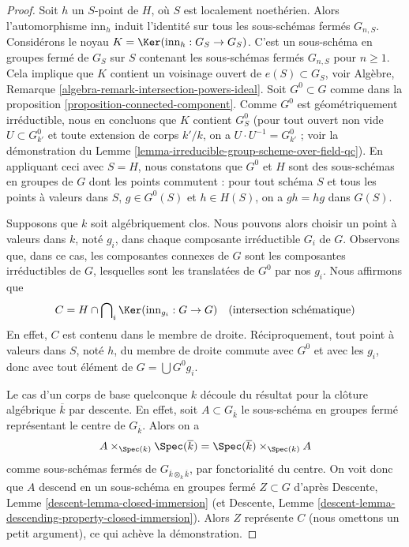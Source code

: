 \begin{proof}
\medskip\noindent
Soit $h$ un $S$-point de $H$, où $S$ est localement noethérien.
Alors l'automorphisme $\text{inn}_h$ induit l'identité sur tous
les sous-schémas fermés $G_{n, S}$. Considérons le noyau
$K = \Ker(\text{inn}_h : G_S \to G_S)$.
C'est un sous-schéma en groupes fermé de $G_S$ sur $S$ contenant les
sous-schémas fermés $G_{n, S}$ pour $n \geq 1$.
Cela implique que $K$ contient un voisinage ouvert de
$e(S) \subset G_S$, voir
Algèbre, Remarque \ref{algebra-remark-intersection-powers-ideal}.
Soit $G^0 \subset G$ comme dans la proposition \ref{proposition-connected-component}.
Comme $G^0$ est géométriquement irréductible, nous en concluons que $K$ contient
$G^0_S$ (pour tout ouvert non vide $U \subset G^0_{k'}$ et toute extension de corps
$k'/k$, on a $U \cdot U^{-1} = G^0_{k'}$ ; voir la démonstration du
Lemme \ref{lemma-irreducible-group-scheme-over-field-qc}).
En appliquant ceci avec $S = H$, nous constatons que $G^0$ et $H$
sont des sous-schémas en groupes de $G$ dont les points commutent : pour tout schéma $S$
et tous les points à valeurs dans $S$, $g \in G^0(S)$ et $h \in H(S)$, on a
$gh = hg$ dans $G(S)$.

\medskip\noindent
Supposons que $k$ soit algébriquement clos. Nous pouvons alors choisir un point à valeurs dans $k$,
noté $g_i$, dans chaque composante irréductible $G_i$ de $G$. Observons que,
dans ce cas, les composantes connexes de $G$ sont les composantes irréductibles
de $G$, lesquelles sont les translatées de $G^0$ par nos $g_i$. Nous affirmons que
$$
C = H \cap \bigcap\nolimits_i \Ker(\text{inn}_{g_i} : G \to G)
\quad (\text{intersection schématique})
$$
En effet, $C$ est contenu dans le membre de droite. Réciproquement, tout
point à valeurs dans $S$, noté $h$, du membre de droite commute avec $G^0$
et avec les $g_i$, donc avec tout élément de $G = \bigcup G^0g_i$.

\medskip\noindent
Le cas d'un corps de base quelconque $k$ découle du résultat pour la
clôture algébrique $\overline{k}$ par descente. En effet, soit
$A \subset G_{\overline{k}}$ le sous-schéma en groupes fermé représentant
le centre de $G_{\overline{k}}$. Alors on a
$$
A \times_{\Spec(k)} \Spec(\overline{k}) =
\Spec(\overline{k}) \times_{\Spec(k)} A
$$
comme sous-schémas fermés de $G_{\overline{k} \otimes_k \overline{k}}$, par
fonctorialité du centre. On voit donc que $A$ descend
en un sous-schéma en groupes fermé $Z \subset G$ d'après
Descente, Lemme \ref{descent-lemma-closed-immersion}
(et Descente, Lemme \ref{descent-lemma-descending-property-closed-immersion}).
Alors $Z$ représente $C$ (nous omettons un petit argument), ce qui achève la démonstration.
\end{proof}







